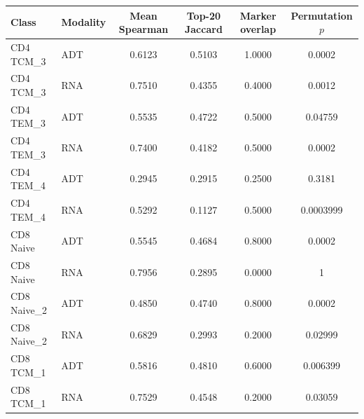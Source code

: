 \begin{tabular}{llcccc}
\toprule
Class & Modality & Mean Spearman & Top-20 Jaccard & Marker overlap & Permutation $p$ \\
\midrule
CD4 TCM\_3 & ADT & 0.6123 & 0.5103 & 1.0000 & 0.0002 \\
CD4 TCM\_3 & RNA & 0.7510 & 0.4355 & 0.4000 & 0.0012 \\
CD4 TEM\_3 & ADT & 0.5535 & 0.4722 & 0.5000 & 0.04759 \\
CD4 TEM\_3 & RNA & 0.7400 & 0.4182 & 0.5000 & 0.0002 \\
CD4 TEM\_4 & ADT & 0.2945 & 0.2915 & 0.2500 & 0.3181 \\
CD4 TEM\_4 & RNA & 0.5292 & 0.1127 & 0.5000 & 0.0003999 \\
CD8 Naive & ADT & 0.5545 & 0.4684 & 0.8000 & 0.0002 \\
CD8 Naive & RNA & 0.7956 & 0.2895 & 0.0000 & 1 \\
CD8 Naive\_2 & ADT & 0.4850 & 0.4740 & 0.8000 & 0.0002 \\
CD8 Naive\_2 & RNA & 0.6829 & 0.2993 & 0.2000 & 0.02999 \\
CD8 TCM\_1 & ADT & 0.5816 & 0.4810 & 0.6000 & 0.006399 \\
CD8 TCM\_1 & RNA & 0.7529 & 0.4548 & 0.2000 & 0.03059 \\
\bottomrule
\end{tabular}
